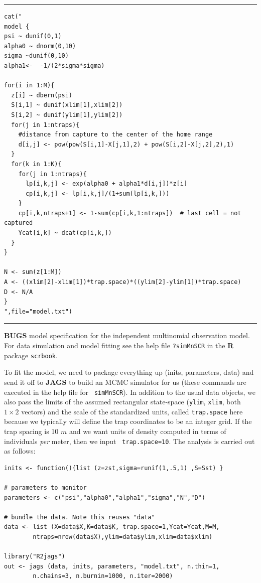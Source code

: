 \begin{panel}[htp]
\centering
\rule[0.15in]{\textwidth}{.03in}
{\small
\begin{verbatim}
cat("
model {
psi ~ dunif(0,1)
alpha0 ~ dnorm(0,10)
sigma ~dunif(0,10)
alpha1<-  -1/(2*sigma*sigma)

for(i in 1:M){
  z[i] ~ dbern(psi)
  S[i,1] ~ dunif(xlim[1],xlim[2])
  S[i,2] ~ dunif(ylim[1],ylim[2])
  for(j in 1:ntraps){
    #distance from capture to the center of the home range
    d[i,j] <- pow(pow(S[i,1]-X[j,1],2) + pow(S[i,2]-X[j,2],2),1)
  }
  for(k in 1:K){
    for(j in 1:ntraps){
      lp[i,k,j] <- exp(alpha0 + alpha1*d[i,j])*z[i]
      cp[i,k,j] <- lp[i,k,j]/(1+sum(lp[i,k,]))
    }
    cp[i,k,ntraps+1] <- 1-sum(cp[i,k,1:ntraps])  # last cell = not captured
    Ycat[i,k] ~ dcat(cp[i,k,])
  }
}

N <- sum(z[1:M])
A <- ((xlim[2]-xlim[1])*trap.space)*((ylim[2]-ylim[1])*trap.space)
D <- N/A
}
",file="model.txt")

\end{verbatim}
}
\rule[-0.15in]{\textwidth}{.03in}
\caption{
{\bf BUGS} model specification for the independent multinomial
observation model. For data simulation and model fitting see the
help file \mbox{\tt ?simMnSCR} in the {\bf R} package \mbox{\tt scrbook}.
}
\label{poisson-mn.panel.mn}
\end{panel}

To fit the model, we need to package everything up (inits, parameters,
data) and send it off to \mbox{\bf JAGS} to build an MCMC simulator
for us (these commands are executed in the help file for \mbox{\tt
  simMnSCR}). In addition to the usual data objects, we also pass
the limits of the assumed rectangular state-space (\mbox{\tt ylim},
\mbox{\tt xlim}, both $1 \times 2$ vectors) and the scale of the
standardized units, called \mbox{\tt trap.space} here because we
typically will define the trap coordinates to be an integer grid. If
the trap spacing is 10 $m$ and we want units of density computed in
terms of individuals {\it per} meter, then we input \mbox{\tt
  trap.space=10}. The analysis is carried out as follows: 
{\small
\begin{verbatim}
inits <- function(){list (z=zst,sigma=runif(1,.5,1) ,S=Sst) }

# parameters to monitor
parameters <- c("psi","alpha0","alpha1","sigma","N","D")

# bundle the data. Note this reuses "data"
data <- list (X=data$X,K=data$K, trap.space=1,Ycat=Ycat,M=M,
        ntraps=nrow(data$X),ylim=data$ylim,xlim=data$xlim)

library("R2jags")
out <- jags (data, inits, parameters, "model.txt", n.thin=1,
        n.chains=3, n.burnin=1000, n.iter=2000)
\end{verbatim}
}

